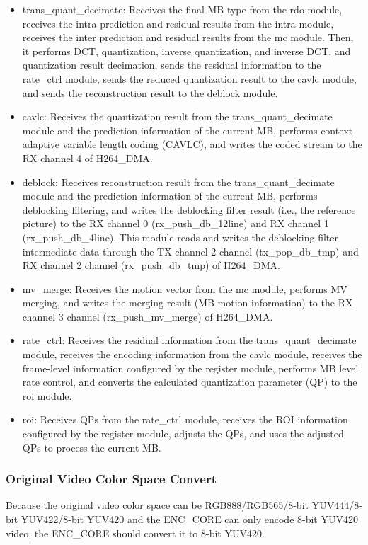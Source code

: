 \documentclass[main\_\_EN.tex]{subfiles}
\begin{document}
\begin{itemize}
    \item trans\_quant\_decimate: Receives the final MB type from the rdo module, receives the intra prediction and residual results from the intra module, receives the inter prediction and residual results from the mc module. Then, it performs DCT, quantization, inverse quantization, and inverse DCT, and quantization result decimation, sends the residual information to the rate\_ctrl module, sends the reduced quantization result to the cavlc module, and sends the reconstruction result to the deblock module.
    \item cavlc: Receives the quantization result from the trans\_quant\_decimate module and the prediction information of the current MB, performs context adaptive variable length coding (CAVLC), and writes the coded stream to the RX channel 4 of H264\_DMA.
    \item deblock: Receives reconstruction result from the trans\_quant\_decimate module and the prediction information of the current MB, performs deblocking filtering, and writes the deblocking filter result (i.e., the reference picture) to the RX channel 0 (rx\_push\_db\_12line) and RX channel 1 (rx\_push\_db\_4line). This module reads and writes the deblocking filter intermediate data through the TX channel 2 channel (tx\_pop\_db\_tmp) and RX channel 2 channel (rx\_push\_db\_tmp) of H264\_DMA.
    \item mv\_merge: Receives the motion vector from the mc module, performs MV merging, and writes the merging result (MB motion information) to the RX channel 3 channel (rx\_push\_mv\_merge) of H264\_DMA.
    \item rate\_ctrl: Receives the residual information from the trans\_quant\_decimate module, receives the encoding information from the cavlc module, receives the frame-level information configured by the register module, performs MB level rate control, and converts the calculated quantization parameter (QP) to the roi module.
    \item roi: Receives QPs from the rate\_ctrl module, receives the ROI information configured by the register module, adjusts the QPs, and uses the adjusted QPs to process the current MB.
\end{itemize}

\subsubsection{Original Video Color Space Convert}\label{sec:h264-csc}
Because the original video color space can be RGB888/RGB565/8-bit YUV444/8-bit YUV422/8-bit YUV420 and the ENC\_CORE can only encode 8-bit YUV420 video, the ENC\_CORE should convert it to 8-bit YUV420.
\end{document}

